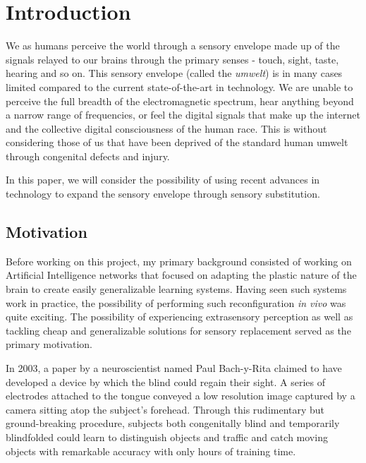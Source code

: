 \documentclass[
hidelinks,
12pt, %
oneside, %
english, %
doublespacing, %
headsepline, %
]{MastersDoctoralThesis} %
\begin{document}
\mainmatter %

\pagestyle{thesis} %


% 
%
%
%
%

\chapter{Introduction}
\label{Introduction}

We as humans perceive the world through a sensory envelope made up of the signals relayed to our brains through the primary senses - touch, sight, taste, hearing and so on. This sensory envelope (called the \textit{umwelt}) is in many cases limited compared to the current state-of-the-art in technology. We are unable to perceive the full breadth of the electromagnetic spectrum, hear anything beyond a narrow range of frequencies, or feel the digital signals that make up the internet and the collective digital consciousness of the human race. This is without considering those of us that have been deprived of the standard human umwelt through congenital defects and injury.

In this paper, we will consider the possibility of using recent advances in technology to expand the sensory envelope through sensory substitution.

\section{Motivation}
Before working on this project, my primary background consisted of working on Artificial Intelligence networks \parencite{hawkins_intelligence:_2007} that focused on adapting the plastic nature of the brain to create easily generalizable learning systems. Having seen such systems work in practice, the possibility of performing such reconfiguration \emph{in vivo} was quite exciting. The possibility of experiencing extrasensory perception as well as tackling cheap and generalizable solutions for sensory replacement served as the primary motivation.

In 2003, a paper \parencite{bach-y-rita_seeing_nodate} by a neuroscientist named Paul Bach-y-Rita claimed to have developed a device by which the blind could regain their sight. A series of electrodes attached to the tongue conveyed a low resolution image captured by a camera sitting atop the subject’s forehead. Through this rudimentary but ground-breaking procedure, subjects both congenitally blind and temporarily blindfolded could learn to distinguish objects and traffic and catch moving objects with remarkable accuracy with only hours of training time.
\end{document}
